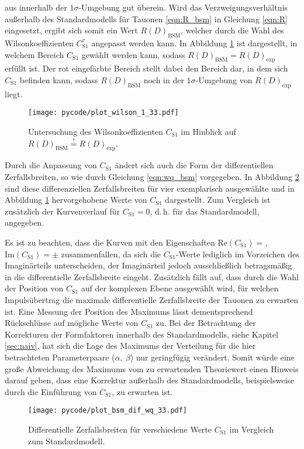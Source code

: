aus \cite{Hiller2016} innerhalb der $\num{1}\sigma$-Umgebung gut überein.
Wird das Verzweigungsverhältnis außerhalb des Standardmodells für Tauonen \eqref{eqn:R_bsm} in Gleichung \eqref{eqn:R} eingesetzt, ergibt sich somit ein Wert $R(D)_{\text{BSM}}$, welcher durch die Wahl des Wilsonkoeffizienten $C_{\text{S}1}^{\tau}$ angepasst werden kann.
In Abbildung \ref{fig:wilson_1} ist dargestellt, in welchem Bereich $C_{\text{S}1}$ gewählt werden kann, sodass $R(D)_{\text{BSM}} = R(D)_{\text{exp}}$ erfüllt ist.
Der rot eingefärbte Bereich stellt dabei den Bereich dar, in dem sich $C_{\text{S}1}$ befinden kann, sodass $R(D)_{\text{BSM}}$ noch in der $\num{1}\sigma$-Umgebung von $R(D)_{\text{exp}}$ liegt.
\begin{figure}
  \centering
  \texttt{[image: pycode/plot\_wilson\_1\_33.pdf]}
  \caption{Untersuchung des Wilsonkoeffizienten $C_{\text{S}1}$ im Hinblick auf $R(D)_{\text{BSM}} \stackrel{!}{=} R(D)_{\text{exp}}$.}
  \label{fig:wilson_1}
\end{figure}
Durch die Anpassung von $C_{\text{S}1}$ ändert sich auch die Form der differentiellen Zerfallsbreiten, so wie durch Gleichung \eqref{eqn:wq_bsm} vorgegeben.
In Abbildung \ref{fig:wilson_2} sind diese differenziellen Zerfallsbreiten für vier exemplarisch ausgewählte und in Abbildung \ref{fig:wilson_1} hervorgehobene Werte von $C_{\text{S}1}$ dargestellt.
Zum Vergleich ist zusätzlich der Kurvenverlauf für $C_{\text{S}1} = \num{0}$, d.\,h. für das Standardmodell, angegeben.

Es ist zu beachten, dass die Kurven mit den Eigenschaften $\mathrm{Re}(C_{\text{S}1}) = $, $\mathrm{Im}(C_{\text{S}1}) = \pm$ zusammenfallen, da sich die $C_{\text{S}1}$-Werte lediglich im Vorzeichen des Imaginärteils unterscheiden, der Imaginärteil jedoch ausschließlich betragsmäßig in die differentielle Zerfallsbreite eingeht.
Zusätzlich fällt auf, dass durch die Wahl der Position von $C_{\text{S}1}$ auf der komplexen Ebene ausgewählt wird, für welchen Impulsübertrag die maximale differentielle Zerfallsbreite der Tauonen zu erwarten ist.
Eine Messung der Position des Maximums lässt dementsprechend Rückschlüsse auf mögliche Werte von $C_{\text{S}1}$ zu.
Bei der Betrachtung der Korrekturen der Formfaktoren innerhalb des Standardmodells, siehe Kapitel \ref{sec:naiv}, hat sich die Lage des Maximums der Verteilung für die hier betrachteten Parameterpaare ($\alpha,\: \beta$) nur geringfügig verändert.
Somit würde eine große Abweichung des Maximums vom zu erwartenden Theoriewert einen Hinweis darauf geben, dass eine Korrektur außerhalb des Standardmodells, beispielsweise durch die Einführung von $C_{\text{S}1}$, zu erwarten ist.

\begin{figure}
  \centering
  \texttt{[image: pycode/plot\_bsm\_dif\_wq\_33.pdf]}
  \caption{Differentielle Zerfallsbreiten für verschiedene Werte $C_{\text{S}1}$ im Vergleich zum Standardmodell.}
  \label{fig:wilson_2}
\end{figure}
